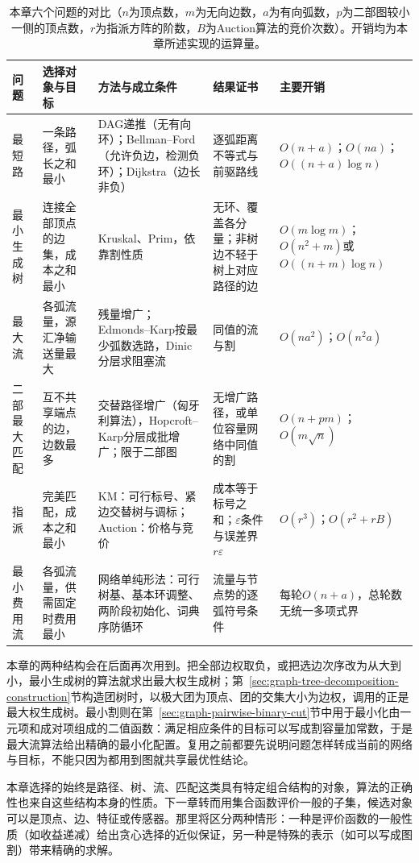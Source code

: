 \begin{table}[!htb]
  \centering\small
  \caption{本章六个问题的对比（$n$为顶点数，$m$为无向边数，$a$为有向弧数，$p$为二部图较小一侧的顶点数，$r$为指派方阵的阶数，$B$为Auction算法的竞价次数）。开销均为本章所述实现的运算量。}
  \label{tab:graph-opt-summary}
  \begin{tabularx}{\linewidth}{@{}l>{\raggedright\arraybackslash}X>{\raggedright\arraybackslash}X>{\raggedright\arraybackslash}X>{\raggedright\arraybackslash}p{30mm}@{}}
    \toprule
    问题 & 选择对象与目标 & 方法与成立条件 & 结果证书 & 主要开销\\
    \midrule
    最短路 & 一条路径，弧长之和最小 & DAG递推（无有向环）；Bellman--Ford（允许负边，检测负环）；Dijkstra（边长非负） & 逐弧距离不等式与前驱路线 & $O(n+a)$；$O(na)$；$O((n+a)\log n)$\\
    最小生成树 & 连接全部顶点的边集，成本之和最小 & Kruskal、Prim，依靠割性质 & 无环、覆盖各分量；非树边不轻于树上对应路径的边 & $O(m\log m)$；$O(n^2+m)$或$O((n+m)\log n)$\\
    最大流 & 各弧流量，源汇净输送量最大 & 残量增广；Edmonds--Karp按最少弧数选路，Dinic分层求阻塞流 & 同值的流与割 & $O(na^2)$；$O(n^2a)$\\
    二部最大匹配 & 互不共享端点的边，边数最多 & 交替路径增广（匈牙利算法），Hopcroft--Karp分层成批增广；限于二部图 & 无增广路径，或单位容量网络中同值的割 & $O(n+pm)$；$O(m\sqrt n)$\\
    指派 & 完美匹配，成本之和最小 & KM：可行标号、紧边交替树与调标；Auction：价格与竞价 & 成本等于标号之和；$\varepsilon$条件与误差界$r\varepsilon$ & $O(r^3)$；$O(r^2+rB)$\\
    最小费用流 & 各弧流量，供需固定时费用最小 & 网络单纯形法：可行树基、基本环调整、两阶段初始化、词典序防循环 & 流量与节点势的逐弧符号条件 & 每轮$O(n+a)$，总轮数无统一多项式界\\
    \bottomrule
  \end{tabularx}
\end{table}

本章的两种结构会在后面再次用到。把全部边权取负，或把选边次序改为从大到小，最小生成树的算法就求出最大权生成树；第~\ref{sec:graph-tree-decomposition-construction}节构造团树时，以极大团为顶点、团的交集大小为边权，调用的正是最大权生成树。最小割则在第~\ref{sec:graph-pairwise-binary-cut}节中用于最小化由一元项和成对项组成的二值函数：满足相应条件的目标可以写成割容量加常数，于是最大流算法给出精确的最小化配置。复用之前都要先说明问题怎样转成当前的网络与目标，不能只因为都用到图就共享最优性结论。

本章选择的始终是路径、树、流、匹配这类具有特定组合结构的对象，算法的正确性也来自这些结构本身的性质。下一章转而用集合函数评价一般的子集，候选对象可以是顶点、边、特征或传感器。那里将区分两种情形：一种是评价函数的一般性质（如收益递减）给出贪心选择的近似保证，另一种是特殊的表示（如可以写成图割）带来精确的求解。
